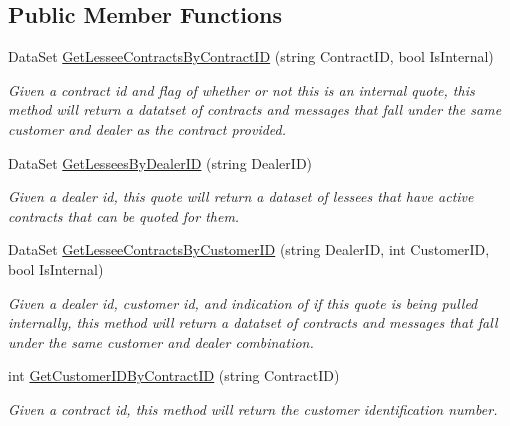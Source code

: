 \subsection*{Public Member Functions}
\begin{DoxyCompactItemize}
\item 
Data\+Set \mbox{\hyperlink{class_g_f_s_c_1_1_services_1_1_end_of_term_1_1_end_of_term_service_aa6e8a43d03024b195fa9c6eaa4411fce}{Get\+Lessee\+Contracts\+By\+Contract\+ID}} (string Contract\+ID, bool Is\+Internal)
\begin{DoxyCompactList}\small\item\em Given a contract id and flag of whether or not this is an internal quote, this method will return a datatset of contracts and messages that fall under the same customer and dealer as the contract provided. \end{DoxyCompactList}\item 
Data\+Set \mbox{\hyperlink{class_g_f_s_c_1_1_services_1_1_end_of_term_1_1_end_of_term_service_ab3c07b3493d794ad578c6ee4cf2fe782}{Get\+Lessees\+By\+Dealer\+ID}} (string Dealer\+ID)
\begin{DoxyCompactList}\small\item\em Given a dealer id, this quote will return a dataset of lessees that have active contracts that can be quoted for them. \end{DoxyCompactList}\item 
Data\+Set \mbox{\hyperlink{class_g_f_s_c_1_1_services_1_1_end_of_term_1_1_end_of_term_service_add17d8f7568bbfa3531858e0fe044d04}{Get\+Lessee\+Contracts\+By\+Customer\+ID}} (string Dealer\+ID, int Customer\+ID, bool Is\+Internal)
\begin{DoxyCompactList}\small\item\em Given a dealer id, customer id, and indication of if this quote is being pulled internally, this method will return a datatset of contracts and messages that fall under the same customer and dealer combination. \end{DoxyCompactList}\item 
int \mbox{\hyperlink{class_g_f_s_c_1_1_services_1_1_end_of_term_1_1_end_of_term_service_a3c89756c24382b7a06861e647c349722}{Get\+Customer\+I\+D\+By\+Contract\+ID}} (string Contract\+ID)
\begin{DoxyCompactList}\small\item\em Given a contract id, this method will return the customer identification number. \end{DoxyCompactList}\item 

\end{DoxyCompactItemize}
